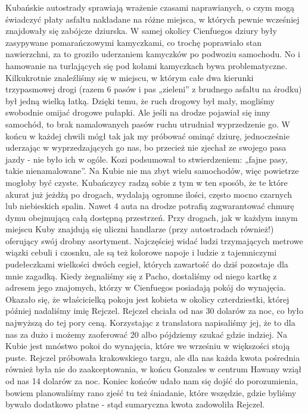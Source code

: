 \noindent Kubańskie autostrady sprawiają wrażenie czasami naprawianych, o czym mogą świadczyć płaty asfaltu nakładane na różne miejsca, w których pewnie wcześniej znajdowały się zabójcze dziurska.
W samej okolicy Cienfuegos dziury były zasypywane pomarańczowymi kamyczkami, co trochę poprawiało stan nawierzchni, za to groziło uderzaniem kamyczków po podwoziu samochodu.
No i hamowanie na turlających się pod kołami kamyczkach bywa problematyczne.
Kilkukrotnie znaleźliśmy się w miejscu, w którym całe dwa kierunki trzypasmowej drogi (razem 6 pasów i pas „zieleni” z brudnego asfaltu na środku) był jedną wielką łatką.
Dzięki temu, że ruch drogowy był mały, mogliśmy swobodnie omijać drogowe pułapki.
Ale jeśli na drodze pojawiał się inny samochód, to brak namalowanych pasów ruchu utrudniał wyprzedzenie go.
W końcu w każdej chwili mógł tak jak my próbować ominąć dziurę, jednocześnie uderzając w wyprzedzających go nas, bo przecież nie zjechał ze swojego pasa jazdy - nie było ich w ogóle.
Kozi podsumował to stwierdzeniem: „fajne pasy, takie nienamalowane”. 
Na Kubie nie ma zbyt wielu samochodów, więc powietrze mogłoby być czyste.
Kubańczycy radzą sobie z tym w ten sposób, że te które akurat już jeżdżą po drogach, wydalają ogromne ilości, często mocno czarnych lub niebieskich spalin.
Nawet 4 auta na drodze potrafią zagwarantować chmurę dymu obejmującą całą dostępną przestrzeń.
Przy drogach, jak w każdym innym miejscu Kuby znajdują się uliczni handlarze (przy autostradach również!) oferujący swój drobny asortyment.
Najczęściej widać ludzi trzymających metrowe wiązki cebuli i czosnku, ale są też kolorowe napoje i ludzie z tajemniczymi pudełeczkami wielkości dwóch cegieł, których zawartość do dziś pozostaje dla mnie zagadką.
Kiedy żegnaliśmy się z Pacho, dostaliśmy od niego kartkę z adresem jego znajomych, którzy w Cienfuegos posiadają pokój do wynajęcia.
Okazało się, że właścicielką pokoju jest kobieta w okolicy czterdziestki, której później nadaliśmy imię Rejczel.
Rejczel chciała od nas 30 dolarów za noc, co było najwyższą do tej pory ceną.
Korzystając z translatora napisaliśmy jej, że to dla nas za dużo i możemy zaoferować 20 albo pójdziemy szukać gdzie indziej.
Na Kubie jest mnóstwo pokoi do wynajęcia, które we wrześniu w większości stoją puste.
Rejczel próbowała krakowskiego targu, ale dla nas każda kwota pośrednia również była nie do zaakceptowania, w końcu Gonzales w centrum Hawany wziął od nas 14 dolarów za noc.
Koniec końców udało nam się dojść do porozumienia, bowiem planowaliśmy rano zjeść tu też śniadanie, które wszędzie, gdzie byliśmy bywało dodatkowo płatne - stąd sumaryczna kwota zadowoliła Rejczel.
